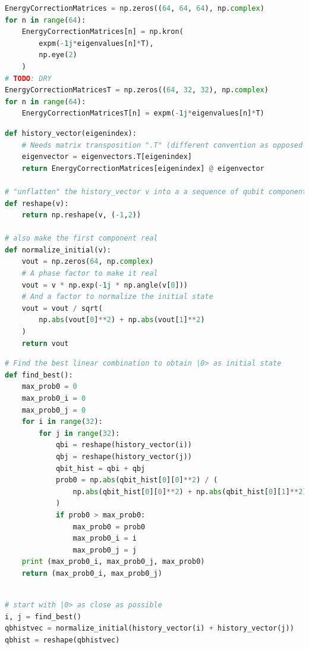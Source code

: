 \begin{lstlisting}[language=Python]
EnergyCorrectionMatrices = np.zeros((64, 64, 64), np.complex)
for n in range(64):
    EnergyCorrectionMatrices[n] = np.kron(
        expm(-1j*eigenvalues[n]*T),
        np.eye(2)
    )
# TODO: DRY
EnergyCorrectionMatricesT = np.zeros((64, 32, 32), np.complex)
for n in range(64):
    EnergyCorrectionMatricesT[n] = expm(-1j*eigenvalues[n]*T)
\end{lstlisting}

\begin{lstlisting}[language=Python]
def history_vector(eigenindex):
    # Needs matrix transposition ".T" (different convention as opposed to Mathematica)
    eigenvector = eigenvectors.T[eigenindex]
    return EnergyCorrectionMatrices[eigenindex] @ eigenvector

# "unflatten" the history_vector v into a a sequence of qubit component pairs
def reshape(v):
    return np.reshape(v, (-1,2))

# also make the first component real
def normalize_initial(v):
    vout = np.zeros(64, np.complex)
    # A phase factor to make it real
    vout = v * np.exp(-1j * np.angle(v[0]))
    # And a factor to normalize the initial state
    vout = vout / sqrt(
        np.abs(vout[0]**2) + np.abs(vout[1]**2)
    )
    return vout
\end{lstlisting}

\begin{lstlisting}[language=Python]
# Find the best linear combination to obtain |0> as initial state
def find_best():
    max_prob0 = 0
    max_prob0_i = 0
    max_prob0_j = 0
    for i in range(32):
        for j in range(32):
            qbi = reshape(history_vector(i))
            qbj = reshape(history_vector(j))
            qbit_hist = qbi + qbj
            prob0 = np.abs(qbit_hist[0][0]**2) / (
                np.abs(qbit_hist[0][0]**2) + np.abs(qbit_hist[0][1]**2)
            )
            if prob0 > max_prob0:
                max_prob0 = prob0
                max_prob0_i = i
                max_prob0_j = j
    print (max_prob0_i, max_prob0_j, max_prob0)
    return (max_prob0_i, max_prob0_j)
    
\end{lstlisting}

\begin{lstlisting}[language=Python]
# start with |0> as close as possible
i, j = find_best()
qbhistvec = normalize_initial(history_vector(i) + history_vector(j))
qbhist = reshape(qbhistvec) 
\end{lstlisting}

